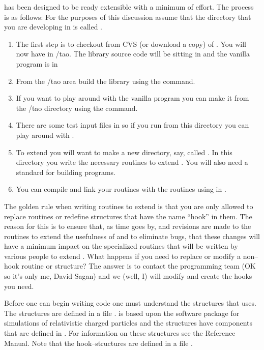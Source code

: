 
\tao has been designed to be ready extensible with a minimum of
effort.  The process is as follows: For the purposes of this
discussion assume that the directory that you are developing \tao in
is called . 
\begin{enumerate}
\item 
The first step is to checkout from CVS (or download a
copy) of \tao. You will now have \tao in
/tao. The library source code will be sitting in 
and the vanilla \tao program is in 
\item 
From the /tao area build the \tao library using the
 command.
\item
If you want to play around with the vanilla \tao program you can make it
from the /tao directory using the  command.
\item
There are some test input files in  so if you run
\tao from this directory you can play around with \tao.
\item
To extend \tao you will want to make a new
directory, say, called . In this directory you write
the necessary routines to extend \tao. You will also need a standard  for building programs.
\item
You can compile and link your routines with the \tao routines using
 in .
\end{enumerate}

The golden rule when writing routines to extend \tao is that you are
only allowed to replace routines or redefine structures that have the
name ``hook'' in them. The reason for this is to ensure that, as time
goes by, and revisions are made to the \tao routines to extend the
usefulness of \tao and to eliminate bugs, that these changes will
have a minimum impact on the specialized routines that will be written
by various people to extend \tao.  What happens if you need to replace
or modify a non--hook routine or structure?  The answer is to contact
the \tao programming team (OK so it's only me, David Sagan) and we
(well, I) will modify \tao and create the hooks you need.

Before one can begin writing code one must understand the structures
that \tao uses. The structures are defined in a file
.  \tao is based upon the \bmad software
package for simulations of relativistic charged particles and the
\tao structures have components that are defined in \bmad. For
information on these structures see the \bmad Reference Manual. Note
that the hook--structures are defined in a file .

